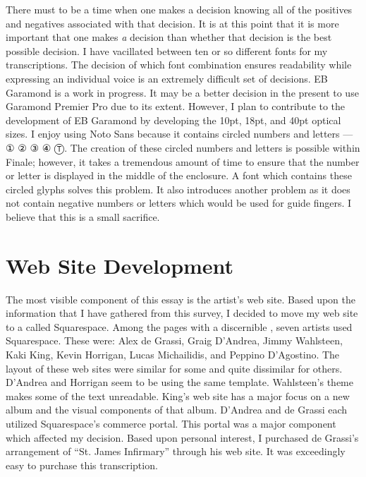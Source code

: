 \documentclass[unicode,hyperfootnotes=false,xetex,colorlinks=true,nofonts,nobib]{tufte-handout}
\newcommand{\textls}[2][5]{%
    \begingroup\addfontfeatures{LetterSpace=#1}#2\endgroup
  }
\renewcommand{\smallcapsspacing}[1]{\textls[10]{#1}}
\renewcommand{\textsc}[1]{\smallcapsspacing{\textsmallcaps{#1}}}
\begin{document}
There must to be a time when one makes a decision knowing all of the positives and negatives associated with that decision. It is at this point that it is more important that one makes \emph{a} decision than whether that decision is the best possible decision. I have vacillated between ten or so different fonts for my transcriptions. The decision of which font combination ensures readability while expressing an individual voice is an extremely difficult set of decisions. EB Garamond is a work in progress. It may be a better decision in the present to use Garamond Premier Pro due to its extent. However, I plan to contribute to the development of EB Garamond by developing the 10pt, 18pt, and 40pt optical sizes. I enjoy using Noto Sans because it contains circled numbers and letters --- {\symbolfont① ② ③ ④ Ⓣ}. The creation of these circled numbers and letters is possible within Finale; however, it takes a tremendous amount of time to ensure that the number or letter is displayed in the middle of the enclosure. A font which contains these circled glyphs solves this problem. It also introduces another problem as it does not contain negative numbers or letters which would be used for guide fingers. I believe that this is a small sacrifice.

\section{Web Site Development}
\label{sec:web-site-development}

The most visible component of this essay is the artist's web site. Based upon the information that I have gathered from this survey, I decided to move my web site to a \textsc{cms} called Squarespace. Among the pages with a discernible \textsc{cms}, seven artists used Squarespace. These were: Alex de Grassi, Graig D'Andrea, Jimmy Wahlsteen, Kaki King, Kevin Horrigan, Lucas Michailidis, and Peppino D'Agostino. The layout of these web sites were similar for some and quite dissimilar for others. D'Andrea and Horrigan seem to be using the same template. Wahlsteen's theme makes some of the text unreadable. King's web site has a major focus on a new album and the visual components of that album. D'Andrea and de Grassi each utilized Squarespace's commerce portal. This portal was a major component which affected my decision. Based upon personal interest, I purchased de Grassi's arrangement of ``St. James Infirmary'' through his web site. It was exceedingly easy to purchase this transcription.
\end{document}
